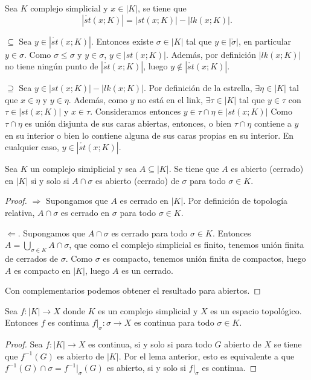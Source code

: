 \documentclass[HS.tex]{subfiles}
\begin{document}
\begin{prop}
Sea $K$ complejo simplicial y $x\in|K|$, se tiene que
\[
|\mathring{st}(x;K)|=|st(x;K)|-|lk(x;K)|.
\]
\end{prop}
\begin{dem}
$\boxed{\subseteq}$ Sea $y\in |\mathring{st}(x;K)|$. Entonces existe $\sigma\in |K|$ tal que $y\in|\mathring{\sigma}|$, en particular $y\in\sigma$. Como $\sigma\leq\sigma$ y $y\in\sigma$, $y\in |st(x;K)|$. Además, por definición $|lk(x;K)|$ no tiene ningún punto de $|\mathring{st}(x;K)|$, luego $y\notin|\mathring{st}(x;K)|$.

$\boxed{\supseteq}$ Sea $y\in |st(x;K)|-|lk(x;K)|$. Por definición de la estrella, $\exists\eta\in |K|$ tal que $x\in\eta$ y $y\in\eta$. Además, como $y$ no está en el link, $\exists \tau\in |K|$ tal que $y\in\tau$ con $\tau\in |st(x;K)|$ y $x\in\tau$. Consideramos entonces $y\in\tau\cap\eta\in |st(x;K)|$ Como $\tau\cap\eta$ es unión disjunta de sus caras abiertas, entonces, o bien $\tau\cap\eta$ contiene a $y$ en su interior o bien lo contiene alguna de sus caras propias en su interior. En cualquier caso, $y\in |\mathring{st}(x;K)|$.  \QED
\end{dem}

\begin{lemma}
Sea $K$ un complejo simiplicial y sea $A\subseteq|K|$. Se tiene que $A$ es abierto (cerrado) en $|K|$ si y solo si $A\cap\sigma$ es abierto (cerrado) de $\sigma$ para todo $\sigma\in K$. 
\end{lemma}
\begin{proof}
$\boxed{\Rightarrow}$ Supongamos que $A$ es cerrado en $|K|$. Por definición de topología relativa, $A\cap\sigma$ es cerrado en $\sigma$ para todo $\sigma\in K$.

$\boxed{\Leftarrow}$. Supongamos que $A\cap\sigma$ es cerrado para todo $\sigma\in K$. Entonces $A=\bigcup_{\sigma\in K} A\cap\sigma$, que como el complejo simplicial es finito, tenemos unión finita de cerrados de $\sigma$. Como $\sigma$ es compacto, tenemos unión finita de compactos, luego $A$ es compacto en $|K|$, luego $A$ es un cerrado.

Con complementarios podemos obtener el resultado para abiertos. 
\end{proof}

\begin{lemma}
Sea $f:|K|\to X$ donde $K$ es un complejo simplicial y $X$ es un espacio topológico. Entonces $f$ es continua $f|_{\sigma}:\sigma\to X$ es continua para todo $\sigma\in K$.
\end{lemma}
\begin{proof}
 Sea $f:|K|\to X$ es continua, si y solo si para todo $G$ abierto de $X$ se tiene que $f^{-1}(G)$ es abierto de $|K|$. Por el lema anterior, esto es equivalente a que $f^{-1}(G)\cap\sigma=f^{-1}|_{\sigma}(G)$ es abierto, si y solo si $f|_{\sigma}$ es continua.
\end{proof}
\end{document}
